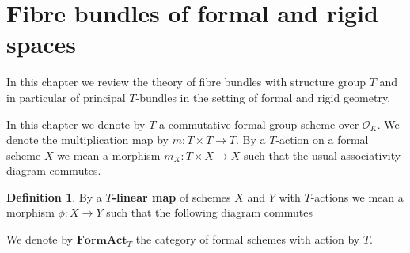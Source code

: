 \documentclass[10pt,oneside]{amsart}
\theoremstyle{definition}
\newtheorem{definition}[theorem]{Definition}
\theoremstyle{remark}
\begin{document}
	\appendix
	\section{Fibre bundles of formal and rigid spaces}
	In this chapter we review the theory of fibre bundles with structure group $T$ and in particular of principal $T$-bundles in the setting of formal and rigid geometry.
		
	
	
	In this chapter we denote by $T$ a commutative formal group scheme over $\mathcal O_K$. We denote the multiplication map by $m:T\times T\rightarrow T$. By a $T$-action on a formal scheme $X$ we mean a morphism $m_X:T\times X\rightarrow X$ such that the usual associativity diagram commutes. 
	\begin{definition}
		By a \textbf{$T$-linear map} of schemes $X$ and $Y$ with $T$-actions we mean a morphism $\phi:X\rightarrow Y$ such that the following diagram commutes
		\begin{center}
		\end{center}
		We denote by $\mathbf{FormAct}_T$ the category of formal schemes with action by $T$.
	\end{definition}
	
\end{document}
